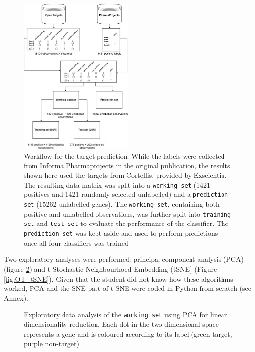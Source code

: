 \begin{figure}[H]
    \centering
    \includegraphics[width=0.5\textwidth]{pics/workflowOpenTargets.jpg}
    \caption{Workflow for the target prediction. While the labels were collected from Informa Pharmaprojects  \cite{pharmaProjects} in the original publication, the results shown here used the targets from Cortellis, provided by Exscientia. The resulting data matrix was split into a \texttt{working set} (1421 positives and 1421 randomly selected unlabelled) and a \texttt{prediction set} (15262 unlabelled genes). The \texttt{working set}, containing both positive and unlabelled observations, was further split into \texttt{training set} and \texttt{test set} to evaluate the performance of the classifier. The \texttt{prediction set} was kept aside and used to perform predictions once all four classifiers was trained}
    \label{fig:ot_workflow}
\end{figure}

Two exploratory analyses were performed: principal component analysis (PCA) (figure \ref{fig:OT_PCA}) and t-Stochastic Neighbourhood Embedding (tSNE) (Figure \ref{fig:OT_tSNE}). Given that the student did not know how these algorithms worked, PCA and the SNE part of t-SNE were coded in Python from scratch (see Annex).

\begin{figure}[H]
    \caption{Exploratory data analysis of the \texttt{working set} using PCA for linear dimensionality reduction. Each dot in the two-dimensional space represents a gene and is coloured according to its label (green target, purple non-target)}
    \label{fig:OT_PCA}
\end{figure}

